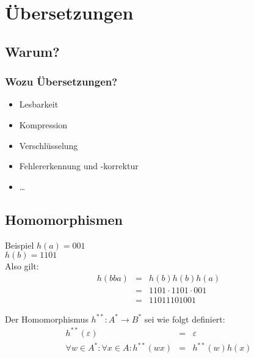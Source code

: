 \section{Übersetzungen}
\subsection{Warum?}
\begin{frame}
	\frametitle{Wozu Übersetzungen?}
	\pause
	\begin{itemize}
		\item Lesbarkeit
		\item Kompression
		\item Verschlüsselung
		\item Fehlererkennung und -korrektur
		\item \dots
	\end{itemize}
\end{frame}

\subsection{Homomorphismen}
\begin{frame}
	\begin{exampleblock}{Beispiel}
		$h(a)=001$\\
		$h(b)=1101$\\
		Also gilt:
		\begin{eqnarray*}
			h(bba)&=&h(b)h(b)h(a)\\
			&=&1101\cdot 1101\cdot 001\\
			&=&11011101001
		\end{eqnarray*}
	\end{exampleblock}
	\pause
	\begin{definition}
		Der Homomorphismus $h^{**}:A^*\rightarrow B^*$ sei wie folgt definiert:
		\begin{eqnarray*}
			h^{**}(\varepsilon)&=&\varepsilon \\
			\forall w\in A^*:\forall x\in A:h^{**}(wx)&=&h^{**}(w)h(x)
		\end{eqnarray*}
	\end{definition}
\end{frame}

